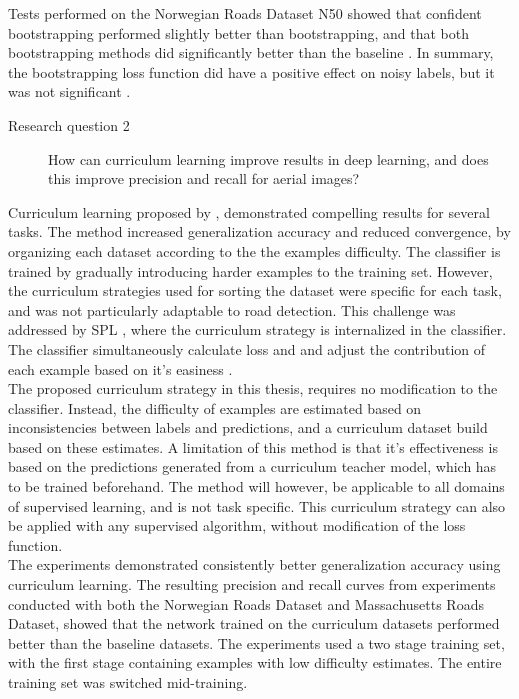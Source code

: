 Tests performed on the Norwegian Roads Dataset N50 showed that confident bootstrapping performed slightly better than bootstrapping, and that both bootstrapping methods did significantly better than the baseline . In summary, the bootstrapping loss function did have a positive effect on noisy labels, but it was not significant . 

\begin{description}
\item[Research question 2]  How can curriculum learning improve results in deep learning, and does this improve precision and recall for aerial images?
\end{description}

Curriculum learning proposed by \cite{Bengio_curriculumlearning}, demonstrated compelling results for several tasks. The method increased generalization accuracy and reduced convergence, by organizing each dataset according to the the examples difficulty. The classifier is trained by gradually introducing harder examples to the training set. However, the curriculum strategies used for sorting the dataset were specific for each task, and was not particularly adaptable to road detection. This challenge was addressed by \ac{SPL} \citep{Kumar_self_paced_learning}, where the curriculum strategy is internalized in the classifier. The classifier simultaneously calculate loss and and adjust the contribution of each example based on it's easiness  .\\

The proposed curriculum strategy in this thesis, requires no modification to the classifier. Instead, the difficulty of examples are estimated based on inconsistencies between labels and predictions, and a curriculum dataset build based on these estimates. A limitation of this method is that it's effectiveness is based on the predictions generated from a curriculum teacher model, which has to be trained beforehand. The method will however, be applicable to all domains of supervised learning, and  is not task specific. This curriculum strategy can also be applied with any supervised algorithm, without modification of the loss function. \\

The experiments demonstrated consistently better generalization accuracy using curriculum learning. The resulting precision and recall curves from experiments conducted with both the Norwegian Roads Dataset and Massachusetts Roads Dataset, showed that the network trained on the curriculum datasets performed better than the baseline datasets. The experiments used a two stage training set, with the first stage containing examples with low difficulty estimates. The entire training set was switched mid-training. \\

